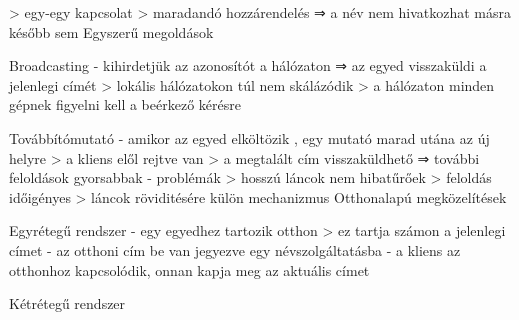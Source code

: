 \documentclass[12pt]{article}
\begin{document}
\begin{description}
                                                                        > egy-egy kapcsolat
                                                                        > maradandó hozzárendelés
                                                                        ⇒ a név nem hivatkozhat másra később sem
                                                                        Egyszerű megoldások 
                                                                    \item Broadcasting
                                                                        - kihirdetjük az azonosítót a hálózaton ⇒ az egyed visszaküldi a jelenlegi címét
                                                                        > lokális hálózatokon túl nem skálázódik
                                                                        > a hálózaton minden gépnek figyelni kell a beérkező kérésre 
                                                                    \item Továbbítómutató
                                                                        - amikor az egyed elköltözik , egy mutató marad utána az új helyre
                                                                        > a kliens elől rejtve van
                                                                        > a megtalált cím visszaküldhető ⇒ további feloldások gyorsabbak
                                                                        - problémák
                                                                        > hosszú láncok nem hibatűrőek
                                                                        > feloldás időigényes
                                                                        > láncok röviditésére külön mechanizmus
                                                                        Otthonalapú megközelítések
                                                                    \item Egyrétegű rendszer
                                                                        - egy egyedhez tartozik otthon
                                                                        > ez tartja számon a jelenlegi címet
                                                                        - az otthoni cím be van jegyezve egy névszolgáltatásba
                                                                        - a kliens az otthonhoz kapcsolódik, onnan kapja meg az aktuális címet
                                                                    \item Kétrétegű rendszer

\end{description}
\end{document}
